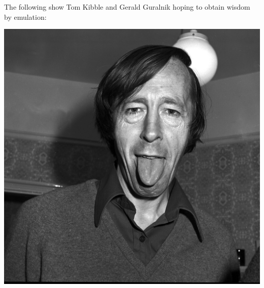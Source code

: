 \documentclass[preprintnumbers,12pt]{revtex4-2}
\begin{document}
The following show Tom Kibble and Gerald Guralnik hoping to obtain wisdom by emulation:

\begin{flushleft}
  \includegraphics[scale=0.10]{tk2.jpg}
\end{flushleft}
\end{document}
